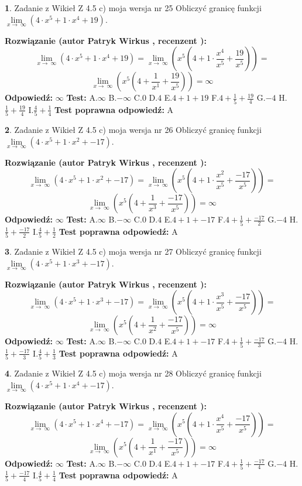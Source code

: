 \documentclass[12pt, a4paper]{article}
\theoremstyle{definition} %
\newtheorem{zad}{}
\newcommand{\zadStart}[1]{\begin{zad}#1\newline}
\newcommand{\zadStop}{\end{zad}}
\newcommand{\rozwStart}[2]{\noindent \textbf{Rozwiązanie (autor #1 , recenzent #2): }\newline}
\newcommand{\rozwStop}{\newline}
\newcommand{\odpStart}{\noindent \textbf{Odpowiedź:}\newline}
\newcommand{\odpStop}{\newline}
\newcommand{\testStart}{\noindent \textbf{Test:}\newline}
\newcommand{\testStop}{\newline}
\newcommand{\kluczStart}{\noindent \textbf{Test poprawna odpowiedź:}\newline}
\newcommand{\kluczStop}{\newline}
\begin{document}
\zadStart{Zadanie z Wikieł Z 4.5 c) moja wersja nr 25}
Obliczyć granicę funkcji  $\lim\limits_{x\to\ \infty}(4 \cdot x^{5}+1 \cdot x^{4}+19)$.
\zadStop
\rozwStart{Patryk Wirkus}{}
$$\lim\limits_{x\to\ \infty}(4 \cdot x^{5}+1 \cdot x^{4}+19) = \lim\limits_{x\to\ \infty}(x^{5}(4 +1 \cdot \frac{x^{4}}{x^{5}}+\frac{19}{x^{5}})) =$$ $$\lim\limits_{x\to\ \infty}(x^{5}(4 +\frac{1}{x^{1}}+\frac{19}{x^{5}})) =\infty$$
\rozwStop
\odpStart
$\infty$
\odpStop
\testStart
A.$\infty$ B.$-\infty$ C.$0$ D.$4$ E.$4 + 1 + 19$
F.$4+\frac{1}{5}+\frac{19}{4}$ G.$-4$
H.$\frac{1}{5}+\frac{19}{4}$
I.$\frac{4}{5}+\frac{1}{4}$
\testStop
\kluczStart
A
\kluczStop



\zadStart{Zadanie z Wikieł Z 4.5 c) moja wersja nr 26}
Obliczyć granicę funkcji  $\lim\limits_{x\to\ \infty}(4 \cdot x^{5}+1 \cdot x^{2}+-17)$.
\zadStop
\rozwStart{Patryk Wirkus}{}
$$\lim\limits_{x\to\ \infty}(4 \cdot x^{5}+1 \cdot x^{2}+-17) = \lim\limits_{x\to\ \infty}(x^{5}(4 +1 \cdot \frac{x^{2}}{x^{5}}+\frac{-17}{x^{5}})) =$$ $$\lim\limits_{x\to\ \infty}(x^{5}(4 +\frac{1}{x^{3}}+\frac{-17}{x^{5}})) =\infty$$
\rozwStop
\odpStart
$\infty$
\odpStop
\testStart
A.$\infty$ B.$-\infty$ C.$0$ D.$4$ E.$4 + 1 + -17$
F.$4+\frac{1}{5}+\frac{-17}{2}$ G.$-4$
H.$\frac{1}{5}+\frac{-17}{2}$
I.$\frac{4}{5}+\frac{1}{2}$
\testStop
\kluczStart
A
\kluczStop



\zadStart{Zadanie z Wikieł Z 4.5 c) moja wersja nr 27}
Obliczyć granicę funkcji  $\lim\limits_{x\to\ \infty}(4 \cdot x^{5}+1 \cdot x^{3}+-17)$.
\zadStop
\rozwStart{Patryk Wirkus}{}
$$\lim\limits_{x\to\ \infty}(4 \cdot x^{5}+1 \cdot x^{3}+-17) = \lim\limits_{x\to\ \infty}(x^{5}(4 +1 \cdot \frac{x^{3}}{x^{5}}+\frac{-17}{x^{5}})) =$$ $$\lim\limits_{x\to\ \infty}(x^{5}(4 +\frac{1}{x^{2}}+\frac{-17}{x^{5}})) =\infty$$
\rozwStop
\odpStart
$\infty$
\odpStop
\testStart
A.$\infty$ B.$-\infty$ C.$0$ D.$4$ E.$4 + 1 + -17$
F.$4+\frac{1}{5}+\frac{-17}{3}$ G.$-4$
H.$\frac{1}{5}+\frac{-17}{3}$
I.$\frac{4}{5}+\frac{1}{3}$
\testStop
\kluczStart
A
\kluczStop



\zadStart{Zadanie z Wikieł Z 4.5 c) moja wersja nr 28}
Obliczyć granicę funkcji  $\lim\limits_{x\to\ \infty}(4 \cdot x^{5}+1 \cdot x^{4}+-17)$.
\zadStop
\rozwStart{Patryk Wirkus}{}
$$\lim\limits_{x\to\ \infty}(4 \cdot x^{5}+1 \cdot x^{4}+-17) = \lim\limits_{x\to\ \infty}(x^{5}(4 +1 \cdot \frac{x^{4}}{x^{5}}+\frac{-17}{x^{5}})) =$$ $$\lim\limits_{x\to\ \infty}(x^{5}(4 +\frac{1}{x^{1}}+\frac{-17}{x^{5}})) =\infty$$
\rozwStop
\odpStart
$\infty$
\odpStop
\testStart
A.$\infty$ B.$-\infty$ C.$0$ D.$4$ E.$4 + 1 + -17$
F.$4+\frac{1}{5}+\frac{-17}{4}$ G.$-4$
H.$\frac{1}{5}+\frac{-17}{4}$
I.$\frac{4}{5}+\frac{1}{4}$
\testStop
\kluczStart
A
\kluczStop
\end{document}
